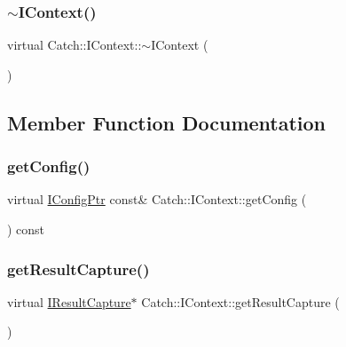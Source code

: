 \subsubsection{\texorpdfstring{$\sim$IContext()}{~IContext()}}
{\footnotesize\ttfamily virtual Catch\+::\+I\+Context\+::$\sim$\+I\+Context (\begin{DoxyParamCaption}{ }\end{DoxyParamCaption})\hspace{0.3cm}{\ttfamily [virtual]}}



\subsection{Member Function Documentation}
\mbox{\label{struct_catch_1_1_i_context_a72a2718232adea8925fec9e71d3efd75}} 
\subsubsection{\texorpdfstring{getConfig()}{getConfig()}}
{\footnotesize\ttfamily virtual \mbox{\hyperlink{namespace_catch_afd20a5d4f9d2f4d525db81a7765367b0}{I\+Config\+Ptr}} const\& Catch\+::\+I\+Context\+::get\+Config (\begin{DoxyParamCaption}{ }\end{DoxyParamCaption}) const\hspace{0.3cm}{\ttfamily [pure virtual]}}

\mbox{\label{struct_catch_1_1_i_context_a684e4ae71d1fdf3060c352ecde1d122f}} 
\subsubsection{\texorpdfstring{getResultCapture()}{getResultCapture()}}
{\footnotesize\ttfamily virtual \mbox{\hyperlink{struct_catch_1_1_i_result_capture}{I\+Result\+Capture}}$\ast$ Catch\+::\+I\+Context\+::get\+Result\+Capture (\begin{DoxyParamCaption}{ }\end{DoxyParamCaption})\hspace{0.3cm}{\ttfamily [pure virtual]}}

